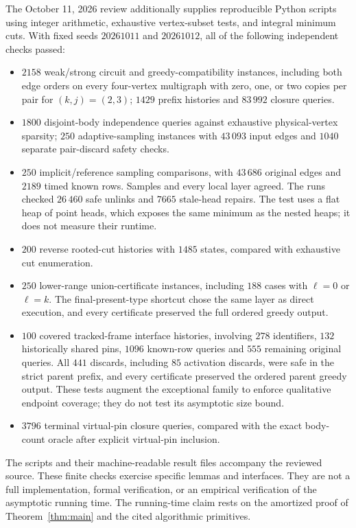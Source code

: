 \documentclass[11pt,a4paper]{article}
\theoremstyle{definition}
\theoremstyle{remark}
\begin{document}
The October 11, 2026 review additionally supplies reproducible
Python scripts using integer arithmetic, exhaustive vertex-subset
tests, and integral minimum cuts. With fixed seeds $20261011$
and $20261012$, all of the following independent checks passed:
\begin{itemize}
 \item $2158$ weak/strong circuit and greedy-compatibility instances,
 including both edge orders on every four-vertex multigraph with
 zero, one, or two copies per pair for $(k,j)=(2,3)$;
 $1429$ prefix histories and $83\,992$ closure queries.
 \item $1800$ disjoint-body independence queries against exhaustive
 physical-vertex sparsity; $250$ adaptive-sampling instances with
 $43\,093$ input edges and $1040$ separate pair-discard safety checks.
 \item $250$ implicit/reference sampling comparisons, with
 $43\,686$ original edges and $2189$ timed known rows.
 Samples and every local layer agreed. The runs checked
 $26\,460$ safe unlinks and $7665$ stale-head repairs.
 The test uses a flat heap of point heads, which exposes the same
 minimum as the nested heaps; it does not measure their runtime.
 \item $200$ reverse rooted-cut histories with $1485$ states,
 compared with exhaustive cut enumeration.
 \item $250$ lower-range union-certificate instances, including
 $188$ cases with $\ell=0$ or $\ell=k$. The final-present-type
 shortcut chose the same layer as direct execution, and every
 certificate preserved the full ordered greedy output.
 \item $100$ covered tracked-frame interface histories, involving
 $278$ identifiers, $132$ historically shared pins,
 $1096$ known-row queries and $555$ remaining original queries.
 All $441$ discards, including $85$ activation discards, were
 safe in the strict parent prefix, and every certificate preserved
 the ordered parent greedy output.
 These tests augment the exceptional family to enforce qualitative
 endpoint coverage; they do not test its asymptotic size bound.
 \item $3796$ terminal virtual-pin closure queries, compared with
 the exact body-count oracle after explicit virtual-pin inclusion.
\end{itemize}

The scripts and their machine-readable result files accompany the
reviewed source. These finite checks exercise specific lemmas and
interfaces. They are not a full implementation, formal verification,
or an empirical verification of the asymptotic running time.
The running-time claim rests on the amortized proof of
Theorem~\ref{thm:main} and the cited algorithmic primitives.
\end{document}

